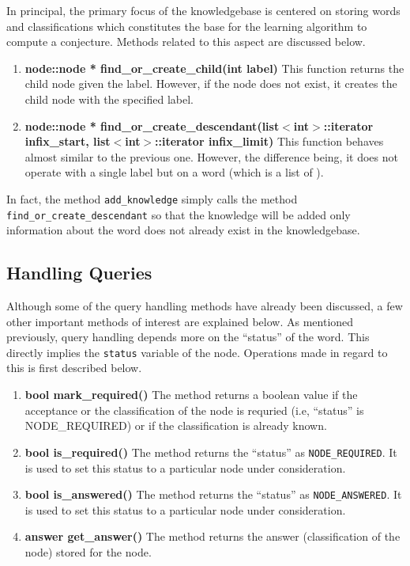 	In principal, the primary focus of the knowledgebase is centered on storing words and classifications which constitutes the base for the learning algorithm to compute a conjecture. Methods related to this aspect are discussed below.
	
\begin{enumerate}
\item \textbf{node::node * find\_or\_create\_child(int label)} \vskip 1pt
	This function returns the child node given the label. However, if the node does not exist, it creates the child node with the specified label.
	
\item \textbf{node::node * find\_or\_create\_descendant(list$<$int$>$::iterator infix\_start, list$<$int$>$::iterator infix\_limit)} \hfill \vskip 1pt
	This function behaves almost similar to the previous one. However, the difference being, it does not operate with a single label but on a word (which is a list of \integer). 
\end{enumerate}	

 In fact, the method \texttt{add\_knowledge} simply calls the method \texttt{find\_or\_create\_descendant} so that the knowledge will be added only information about the word does not already exist in the knowledgebase.


\subsection*{Handling Queries}
	Although some of the query handling methods have already been discussed, a few other important methods of interest are explained below. As mentioned previously, query handling depends more on the ``status'' of the word. This directly implies the \texttt{status} variable of the node. Operations made in regard to this is first described below.
\begin{enumerate}
\item \textbf{bool mark\_required()} \vskip 1pt
	The method returns a boolean value \true if the acceptance or the classification of the node is requried (i.e, ``status'' is NODE\_REQUIRED) or \false if the classification is already known.
	
\item \textbf{bool is\_required()} \vskip 1pt
	The method returns the ``status'' as \texttt{NODE\_REQUIRED}. It is used to set this status to a particular node under consideration.

\item \textbf{bool is\_answered()} \vskip 1pt
	The method returns the ``status'' as \texttt{NODE\_ANSWERED}. It is used to set this status to a particular node under consideration.
	
\item \textbf{answer get\_answer()} \vskip 1pt
	The method returns the answer (classification of the node) stored for the node. 
\end{enumerate}

